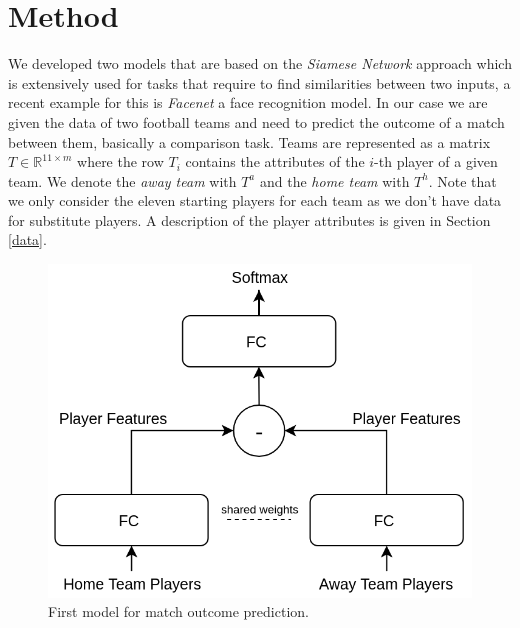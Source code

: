 \documentclass[a4paper]{article}
\begin{document}
\section{Method} \label{models}
We developed two models that are based on the \textit{Siamese Network} approach
\cite{Bromley94} which is extensively used for tasks that require to find
similarities between two inputs, a recent example for this is \textit{Facenet}
\cite{Schroff15} a face recognition model. In our case we are given the data of
two football teams and need to predict the outcome of a match between them,
basically a comparison task. Teams are represented as a matrix $T \in
\mathbb{R}^{11 \times m}$ where the row $T_i$ contains the attributes of the
$i$-th player of a given team. We denote the \textit{away team} with $T^a$ and
the \textit{home team} with $T^h$. Note that we only consider the eleven
starting players for each team as we don't have data for substitute players. A
description of the player attributes is given in Section \ref{data}.

\begin{figure} 
\includegraphics[scale=0.30]{img/Siamese1.png}
\caption{First model for match outcome prediction.}
\label{fig:ffnet}
\end{figure}
\end{document}
